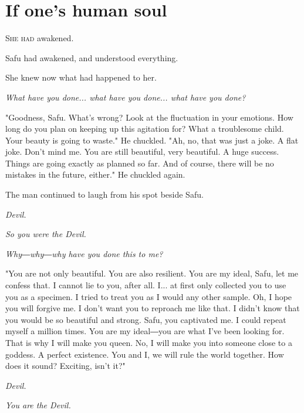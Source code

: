 
\chapter{If one's human soul}


\lettrine{S}{he had} awakened.

Safu had awakened, and understood everything.

She knew now what had happened to her.

\emph{What have you done... what have you done... what have you done?}

"Goodness, Safu. What's wrong? Look at the fluctuation in your emotions.
How long do you plan on keeping up this agitation for? What a
troublesome child. Your beauty is going to waste." He chuckled. "Ah, no,
that was just a joke. A flat joke. Don't mind me. You are still
beautiful, very beautiful. A huge success. Things are going exactly as
planned so far. And of course, there will be no mistakes in the future,
either." He chuckled again.

The man continued to laugh from his spot beside Safu.

\emph{Devil.}

\emph{So you were the Devil.}

\emph{Why―why―why have you done this to me?}

"You are not only beautiful. You are also resilient. You are my ideal,
Safu, let me confess that. I cannot lie to you, after all. I... at first
only collected you to use you as a specimen. I tried to treat you as I
would any other sample. Oh, I hope you will forgive me. I don't want you
to reproach me like that. I didn't know that you would be so beautiful
and strong. Safu, you captivated me. I could repeat myself a million
times. You are my ideal―you are what I've been looking for. That is why
I will make you queen. No, I will make you into someone close to a
goddess. A perfect existence. You and I, we will rule the world
together. How does it sound? Exciting, isn't it?"

\emph{Devil.}

\emph{You are the Devil.}

